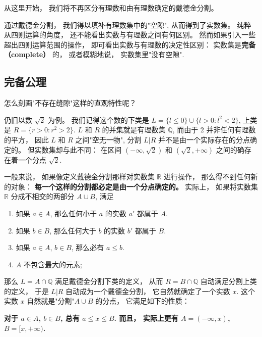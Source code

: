 
\begin{issues}
\issueTODO
{}
\end{issues}


从这里开始， 我们将不再区分有理数和由有理数确定的戴德金分割。 

通过戴德金分割， 我们得以填补有理数集中的"空隙", 从而得到了实数集。 纯粹从四则运算的角度， 还不能看出实数与有理数之间有何区别。 然而如果引入一些超出四则运算范围的操作， 即可看出实数与有理数的决定性区别： 实数集是\textbf{完备 （complete）} 的， 或者模糊地说， 实数集里"没有空隙".

\subsection{完备公理}

怎么刻画"不存在缝隙"这样的直观特性呢？

仍旧以数 $\sqrt{2}$ 为例。 我们记得这个数的下类是 $L=\{l\leq0\}\cup\{l>0:l^2<2\}$, 上类是 $R=\{r>0:r^2>2\}$. $L$ 和 $R$ 的并集就是有理数集 $\mathbb{Q}$, 而由于 2 并非任何有理数的平方， 因此 $L$ 和 $R$ 之间"空无一物", 分割 $L|R$ 并不是由一个实际存在的分点确定的。 但实数集却与此不同： 在区间 $(-\infty,\sqrt{2})$ 和 $(\sqrt{2},+\infty)$ 之间的确存在着一个分点 $\sqrt{2}$. 

一般来说， 如果像定义戴德金分割那样对实数集 $\mathbb{R}$ 进行操作， 那么得不到任何新的对象： \textbf{每一个这样的分割都必定是由一个分点确定的。} 实际上， 如果将实数集 $\mathbb{R}$ 分成不相交的两部分 $A\cup B$, 满足

\begin{enumerate}
\item 如果 $a\in A$, 那么任何小于 $a$ 的实数 $a'$ 都属于 $A$.
\item 如果 $b\in B$, 那么任何大于 $b$ 的实数 $b'$ 都属于 $B$.
\item 如果 $a\in A$, $b\in B$, 那么必有 $a\leq b$.
\item $A$ 不包含最大的元素;
\end{enumerate}

那么 $L=A\cap\mathbb{Q}$ 满足戴德金分割下类的定义， 从而 $R=B\cap\mathbb{Q}$ 自动满足分割上类的定义， 于是 $L|R$ 自动成为一个戴德金分割， 它自然就确定了一个实数 $x$. 这个实数 $x$ 自然就是"分割"$A\cup B$ 的分点， 它满足如下的性质：

\textbf{对于 $a\in A$, $b\in B$, 总有 $a\leq x\leq B$. 而且， 实际上更有 $A=(-\infty,x)$, $B=[x,+\infty)$.}

